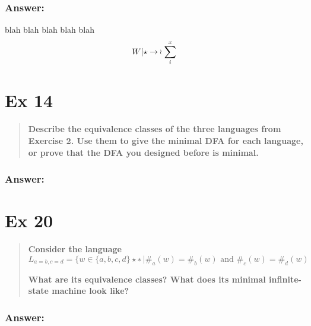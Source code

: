 \documentclass[titlepage]{article}\usepackage[]{graphicx}\usepackage[]{color}
\begin{document}
\subsubsection*{Answer:}
\vspace{8cm}

blah blah  blah blah blah
\[ W | \star \to \text{\rotatebox{90}{\textasciitilde}} \sum_{i}^x \]
\section*{Ex 14}
\begin{quote}
  \textbf{Describe the equivalence classes of the three languages from Exercise
  2. Use them to give the minimal DFA for each language, or prove that the DFA
  you designed before is minimal.}
\end{quote}
\subsubsection{Answer:}
\vspace{8cm}




\section*{Ex 20}
\begin{quote}
  \textbf{Consider the language}
  \[ L_{a=b,c=d } = \{ w \in \{a,b, c ,d \} \star ∗ \, | \#_a (w) = \#_b (w) \text{ and }
    \#_c (w) = \#_d (w )
  \]
  
\textbf{What are its equivalence classes? What does its minimal infinite-state machine
look like?}
\end{quote}

\subsubsection{Answer:}
\vspace{8cm}
\end{document}

